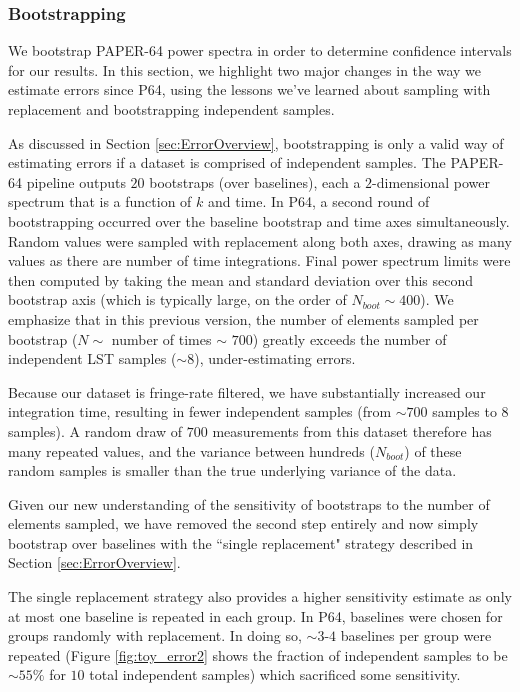 \documentclass[preprint2,numberedappendix,tighten]{aastex6}  %
\begin{document}
\subsubsection{Bootstrapping}
\label{sec:Boot}

We bootstrap PAPER-64 power spectra in order to determine confidence intervals for our results. In this section, we highlight two major changes in the way we estimate errors since P64, using the lessons we've learned about sampling with replacement and bootstrapping independent samples.

As discussed in Section \ref{sec:ErrorOverview}, bootstrapping is only a valid way of estimating errors if a dataset is comprised of independent samples. The PAPER-64 pipeline outputs $20$ bootstraps (over baselines), each a $2$-dimensional power spectrum that is a function of $k$ and time. In P64, a second round of bootstrapping occurred over the baseline bootstrap and time axes simultaneously. Random values were sampled with replacement along both axes, drawing as many values as there are number of time integrations. Final power spectrum limits were then computed by taking the mean and standard deviation over this second bootstrap axis (which is typically large, on the order of $N_{boot} \sim 400$). We emphasize that in this previous version, the number of elements sampled per bootstrap ($N \sim $ number of times $\sim$ $700$) greatly exceeds the number of independent LST samples ($\sim$$8$), under-estimating errors.

Because our dataset is fringe-rate filtered, we have substantially increased our integration time, resulting in fewer independent samples (from $\sim700$ samples to $8$ samples). A random draw of $700$ measurements from this dataset therefore has many repeated values, and the variance between hundreds ($N_{boot}$) of these random samples is smaller than the true underlying variance of the data. 

Given our new understanding of the sensitivity of bootstraps to the number of elements sampled, we have removed the second step entirely and now simply bootstrap over baselines with the ``single replacement" strategy described in Section \ref{sec:ErrorOverview}.

The single replacement strategy also provides a higher sensitivity estimate as only at most one baseline is repeated in each group. In P64, baselines were chosen for groups randomly with replacement. In doing so, $\sim$$3$-$4$ baselines per group were repeated (Figure \ref{fig:toy_error2} shows the fraction of independent samples to be $\sim$$55\%$ for $10$ total independent samples) which sacrificed some sensitivity. 
\end{document}
